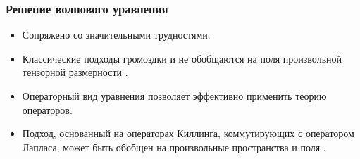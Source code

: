 \documentclass{beamer}
\begin{document}

    \begin{frame}\frametitle{Решение волнового уравнения}

        \begin{itemize}

            \item Сопряжено со значительными трудностями.

            \item Классические подходы громоздки и не обобщаются на поля произвольной тензорной размерности \cite{burlankov_tmf}.

            \item Операторный вид уравнения позволяет эффективно применить теорию операторов.

            \item Подход, основанный на операторах Киллинга, коммутирующих с оператором Лапласа, может быть обобщен на произвольные пространства и поля \cite{burlankov_tmf}.

        \end{itemize}

    \end{frame}

\end{document}
